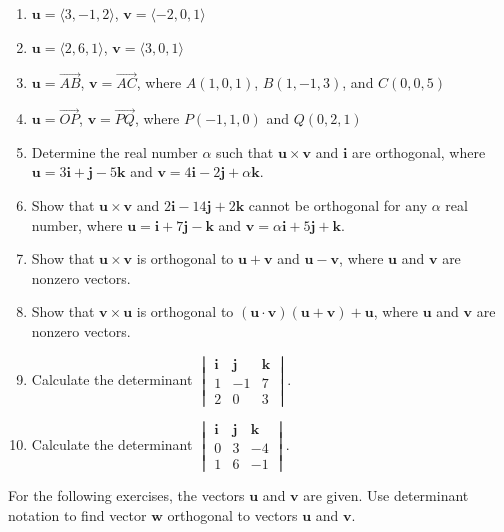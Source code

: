 \documentclass{exercises}
\begin{document}
\begin{enumerate}[resume]
\item $\mathbf{u}=\langle3,-1,2\rangle$, $\mathbf{v}=\langle-2,0,1\rangle$
\item $\mathbf{u}=\langle2,6,1\rangle$, $\mathbf{v}=\langle3,0,1\rangle$
\item $\mathbf{u}=\overset{\to}{AB}$, $\mathbf{v}=\overset{\to}{AC}$, where $A(1,0,1)$, $B(1,-1,3)$, and $C(0,0,5)$
\item $\mathbf{u}=\overset{\to}{OP}$, $\mathbf{v}=\overset{\to}{PQ}$, where $P(-1,1,0)$ and $Q(0,2,1)$
\item Determine the real number $\alpha$ such that $\mathbf{u}\times \mathbf{v}$ and $\mathbf{i}$ are orthogonal, where $\mathbf{u}=3\mathbf{i}+\mathbf{j}-5\mathbf{k}$ and $\mathbf{v}=4\mathbf{i}-2\mathbf{j}+\alpha \mathbf{k}$.
\item Show that $\mathbf{u}\times \mathbf{v}$ and $2\mathbf{i}-14\mathbf{j}+2\mathbf{k}$ cannot be orthogonal for any $\alpha$ real number, where $\mathbf{u}=\mathbf{i}+7\mathbf{j}-\mathbf{k}$ and $\mathbf{v}=\alpha \mathbf{i}+5\mathbf{j}+\mathbf{k}$.
\item Show that $\mathbf{u}\times \mathbf{v}$ is orthogonal to $\mathbf{u}+\mathbf{v}$ and $\mathbf{u}-\mathbf{v}$, where $\mathbf{u}$ and $\mathbf{v}$ are nonzero vectors.
\item Show that $\mathbf{v}\times \mathbf{u}$ is orthogonal to $(\mathbf{u}\cdot \mathbf{v})(\mathbf{u}+\mathbf{v})+\mathbf{u}$, where $\mathbf{u}$ and $\mathbf{v}$ are nonzero vectors.
\item Calculate the determinant $\begin{vmatrix}\mathbf{i} & \mathbf{j} & \mathbf{k} \\ 1 & -1 & 7 \\ 2 & 0 & 3\end{vmatrix}$.
\item Calculate the determinant $\begin{vmatrix}\mathbf{i} & \mathbf{j} & \mathbf{k} \\ 0 & 3 & -4 \\ 1 & 6 & -1\end{vmatrix}$.
\end{enumerate}

For the following exercises, the vectors $\mathbf{u}$ and $\mathbf{v}$ are given. Use determinant notation to find vector $\mathbf{w}$ orthogonal to vectors $\mathbf{u}$ and $\mathbf{v}$.
\end{document}
